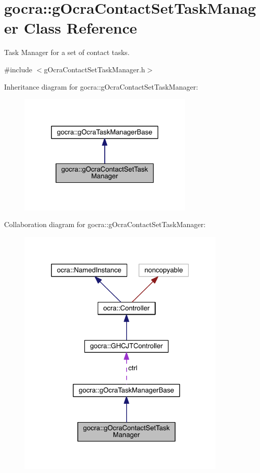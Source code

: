 \hypertarget{classgocra_1_1gOcraContactSetTaskManager}{}\section{gocra\+:\+:g\+Ocra\+Contact\+Set\+Task\+Manager Class Reference}
\label{classgocra_1_1gOcraContactSetTaskManager}


Task Manager for a set of contact tasks.  




{\ttfamily \#include $<$g\+Ocra\+Contact\+Set\+Task\+Manager.\+h$>$}



Inheritance diagram for gocra\+:\+:g\+Ocra\+Contact\+Set\+Task\+Manager\+:\nopagebreak
\begin{figure}[H]
\begin{center}
\leavevmode
\includegraphics[width=237pt]{d7/d57/classgocra_1_1gOcraContactSetTaskManager__inherit__graph}
\end{center}
\end{figure}


Collaboration diagram for gocra\+:\+:g\+Ocra\+Contact\+Set\+Task\+Manager\+:\nopagebreak
\begin{figure}[H]
\begin{center}
\leavevmode
\includegraphics[width=282pt]{d7/d15/classgocra_1_1gOcraContactSetTaskManager__coll__graph}
\end{center}
\end{figure}
